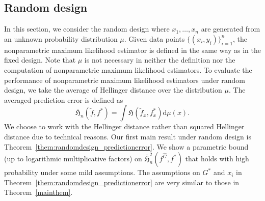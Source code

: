 \documentclass[11pt]{article}
\numberwithin{equation}{section}
\newcommand{\diff}{\mathrm{d}} %
\begin{document}
\subsection{Random design}

In this section, we consider the random design where $x_1,\dots,x_n$ are generated from an unknown probability distribution $\mu$. Given data points $\{(x_i,y_i)\}_{i=1}^n$, the nonparametric maximum likelihood estimator is defined in the same way as in the fixed design. Note that $\mu$ is not necessary in neither the definition nor  the computation of nonparametric maximum likelihood estimators. To evaluate the performance of nonparametric maximum likelihood estimators under random design, we take the average of Hellinger distance over the distribution $\mu$.  The averaged prediction error is defined as 
\begin{equation*}
\bar{\mathfrak{H}}_n\left(\tilde{f}, f^{*}\right) = \int \mathfrak{H}\left(\tilde{f}_{x}, f^{*}_{x}\right) \diff \mu(x).
\end{equation*}
We choose to work with the Hellinger distance rather than squared Hellinger distance due to technical reasons.
Our first main result under random design is Theorem~\ref{them:randomdesign_predictionerror}. We show a parametric bound (up to logarithmic multiplicative factors) on $\bar{\mathfrak{H}}_n^2\left(f^{\hat{G}}, f^{*}\right)$ that holds with high probability under some mild assumptions. The assumptions on $G^*$ and $x_i$ in Theorem~\ref{them:randomdesign_predictionerror} are very similar to those in Theorem~\ref{mainthem}.
\end{document}
